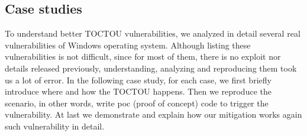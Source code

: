 \subsection{Case studies}
To understand better TOCTOU vulnerabilities, we analyzed in detail several real vulnerabilities of Windows operating system. Although listing these vulnerabilities is not difficult, since for most of them, there is no exploit nor details released previously, understanding, analyzing and reproducing them took us a lot of error. In the following case study, for each case, we first briefly introduce where and how the TOCTOU happens. Then we reproduce the scenario, in other words, write poc (proof of concept) code to trigger the vulnerability. At last we demonstrate and explain how our mitigation works again such vulnerability in detail.
